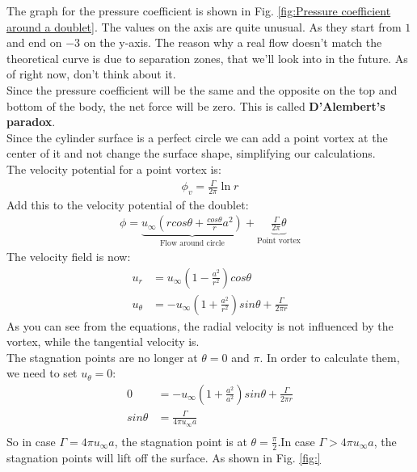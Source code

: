 \documentclass{article}
\begin{document}
The graph for the pressure coefficient is shown in Fig. \ref{fig:Pressure coefficient around a doublet}. The values on the axis are quite unusual. As they start from $1$ and end on $-3$ on the y-axis. The reason why a real flow doesn't match the theoretical curve is due to separation zones, that we'll look into in the future. As of right now, don't think about it.\\
Since the pressure coefficient will be the same and the opposite on the top and bottom of the body, the net force will be zero. This is called \textbf{D'Alembert's paradox}.\\
Since the cylinder surface is a perfect circle we can add a point vortex at the center of it and not change the surface shape, simplifying our calculations.\\
The velocity potential for a point vortex is:
\begin{align*}
    \phi_v=\frac{\Gamma}{2\pi}\ln r
\end{align*}
Add this to the velocity potential of the doublet:
\begin{align*}
    \phi=\underbrace{u_{\infty}(rcos\theta + \frac{cos\theta}{r}a^2)}_\text{Flow around circle}+\underbrace{\frac{\Gamma}{2\pi}\theta}_\text{Point vortex}
\end{align*}
The velocity field is now:
\begin{align*}
    u_r &= u_{\infty}\left(1-\frac{a^2}{r^2}\right)cos\theta\\
    u_\theta &= -u_{\infty}\left(1+\frac{a^2}{r^2}\right)sin\theta+\frac{\Gamma}{2\pi r}
\end{align*}
As you can see from the equations, the radial velocity is not influenced by the vortex, while the tangential velocity is.\\
The stagnation points are no longer at $\theta=0$ and $\pi$. In order to calculate them, we need to set $u_\theta=0$:
\begin{align*}
    0 &= -u_{\infty}\left(1+\frac{a^2}{a^2}\right)sin\theta+\frac{\Gamma}{2\pi r}\\
    sin\theta&=\frac{\Gamma}{4\pi u_\infty a}\\
\end{align*}
So in case $\Gamma=4\pi u_\infty a$, the stagnation point is at $\theta=\frac{\pi}{2}$.In case $\Gamma>4\pi u_\infty a$, the stagnation points will lift off the surface. As shown in Fig. \ref{fig:}\\
\end{document}
